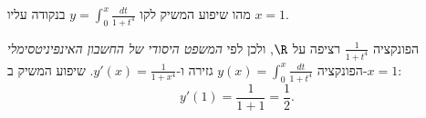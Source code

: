 
\begin{question}
מהו שיפוע המשיק לקו $y=\int_0^x\frac{dt}{1+t^4}$ בנקודה עליו $x=1$.
\end{question}

\begin{solution}
הפונקציה $\frac1{1+t^4}$ רציפה על $\R$, ולכן לפי \emph{המשפט היסודי של החשבון האינפיניטסימלי} הפונקציה $y(x)=\int_0^x\frac{dt}{1+t^4}$ גזירה ו-$y'(x)=\frac1{1+x^4}$. שיפוע המשיק ב-$x=1$:
\[
y'(1)=\frac1{1+1}=\frac12.
\]
\end{solution}
